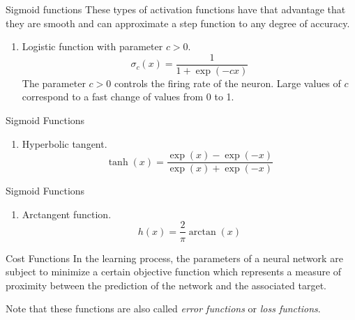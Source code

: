 \documentclass{beamer}
\begin{document}
\begin{frame}{Sigmoid functions}
These types of activation functions have that advantage that they are smooth and can approximate a step function to any degree of accuracy.
	\begin{enumerate}
		\item Logistic function with parameter $c>0$.
		\begin{equation*}
			\sigma_c(x)= \frac{1}{1+ \exp(-cx)}
		\end{equation*}
		The parameter $c>0$ controls the firing rate of the neuron. Large values of $c $ correspond to a fast change of values from 0 to 1. 
	\end{enumerate}
\end{frame}

\begin{frame}{Sigmoid Functions}
	\begin{enumerate}
		\item Hyperbolic tangent. 
		\begin{equation*}
			\tanh (x)= \frac{\exp(x)- \exp(-x)}{\exp(x)+ \exp(-x)}
		\end{equation*}
	\end{enumerate}
\end{frame}

\begin{frame}{Sigmoid Functions}
	\begin{enumerate}
		\item Arctangent function.  
		\begin{equation*}
			h(x)=\frac{2}{\pi}\arctan(x)
		\end{equation*}
	\end{enumerate}
\end{frame}

\begin{frame}{Cost Functions}
	In the learning process, the parameters of a neural network are subject to minimize a certain objective function which represents a measure of proximity between the prediction of the network and the associated target.
	
	Note that these functions are also called \textit{error functions} or \textit{loss functions}. 
\end{frame}
\end{document}
